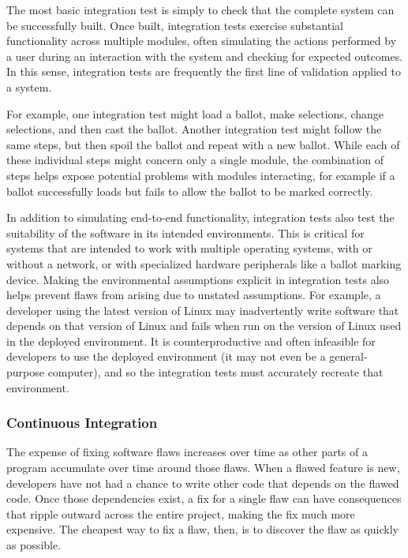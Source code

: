 The most basic integration test is simply to check that the complete
system can be successfully built. Once built, integration tests
exercise substantial functionality across multiple modules, often
simulating the actions performed by a user during an interaction with
the system and checking for expected outcomes. In this sense,
integration tests are frequently the first line of validation applied
to a system.

For example, one integration test might load a ballot, make
selections, change selections, and then cast the ballot. Another
integration test might follow the same steps, but then spoil the
ballot and repeat with a new ballot. While each of these individual
steps might concern only a single module, the combination of steps
helps expose potential problems with modules interacting, for example
if a ballot successfully loads but fails to allow the ballot to be
marked correctly.

In addition to simulating end-to-end functionality, integration tests
also test the suitability of the software in its intended
environments. This is critical for systems that are intended to work
with multiple operating systems, with or without a network, or with
specialized hardware peripherals like a ballot marking device. Making
the environmental assumptions explicit in integration tests also helps
prevent flaws from arising due to unstated assumptions. For example, a
developer using the latest version of Linux may inadvertently write
software that depends on that version of Linux and fails when run on
the version of Linux used in the deployed environment. It is
counterproductive and often infeasible for developers to use the
deployed environment (it may not even be a general-purpose computer),
and so the integration tests must accurately recreate that
environment.

\subsubsection{Continuous Integration}

The expense of fixing software flaws increases over time as other
parts of a program accumulate over time around those flaws. When a
flawed feature is new, developers have not had a chance to write other
code that depends on the flawed code. Once those dependencies exist, a
fix for a single flaw can have consequences that ripple outward across
the entire project, making the fix much more expensive. The cheapest
way to fix a flaw, then, is to discover the flaw as quickly as
possible.

